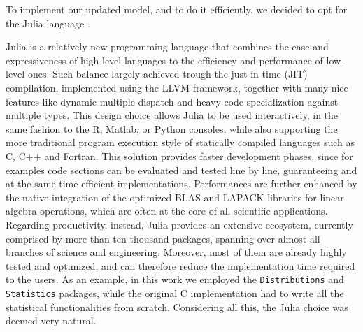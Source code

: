 \documentclass[12pt,	%
	a4paper,		%
	twoside,		%
	openright,		%
	titlepage,%
	]{book}
\theoremstyle{definition}
\newcommand{\mjline}[1]{\texttt{#1}}
\begin{document}
To implement our updated model, and to do it efficiently, we decided to opt for the Julia language \cite{Julia-cite}. 

Julia is a relatively new programming language that combines the ease and expressiveness of high-level languages to the efficiency and performance of low-level ones. Such balance largely achieved trough the just-in-time (JIT) compilation, implemented using the LLVM framework, together with many nice features like dynamic multiple dispatch and heavy code specialization against multiple types. This design choice allows Julia to be used interactively, in the same fashion to the R, Matlab, or Python consoles, while also supporting the more traditional program execution style of statically compiled languages such as C, C++ and Fortran. This solution provides faster development phases, since for examples code sections can be evaluated and tested line by line, guaranteeing and at the same time efficient implementations. Performances are further enhanced by the native integration of the optimized BLAS \cite{blas} and LAPACK libraries for linear algebra operations, which are often at the core of all scientific applications. Regarding productivity, instead, Julia provides an extensive ecosystem, currently comprised by more than ten thousand packages, spanning over almost all branches of science and engineering. Moreover, most of them are already highly tested and optimized, and can therefore reduce the implementation time required to the users. As an example, in this work we employed the \mjline{Distributions} \cite{JSSv098i16} \cite{Distributions.jl-2019} and \mjline{Statistics} packages, while the original C implementation had to write all the statistical functionalities from scratch. Considering all this, the Julia choice was deemed very natural.
\end{document}
